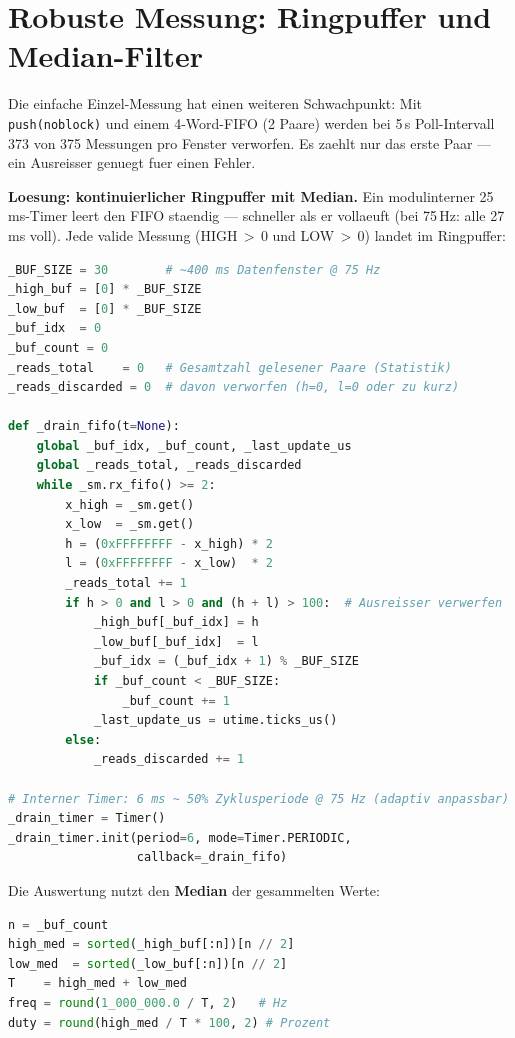 \documentclass[11pt,a4paper]{article}
\begin{document}
\section{Robuste Messung: Ringpuffer und Median-Filter}

Die einfache Einzel-Messung hat einen weiteren Schwachpunkt:
Mit \texttt{push(noblock)} und einem 4-Word-FIFO (2 Paare)
werden bei 5\,s Poll-Intervall 373 von 375 Messungen pro Fenster verworfen.
Es zaehlt nur das erste Paar --- ein Ausreisser genuegt fuer einen Fehler.

\textbf{Loesung: kontinuierlicher Ringpuffer mit Median.}
Ein modulinterner 25\,ms-Timer leert den FIFO staendig ---
schneller als er vollaeuft (bei 75\,Hz: alle 27\,ms voll).
Jede valide Messung (HIGH\,$>$\,0 und LOW\,$>$\,0) landet im Ringpuffer:

\begin{lstlisting}[language=Python, caption={25 ms Drain-Timer und Ringpuffer-Akkumulation}]
_BUF_SIZE = 30        # ~400 ms Datenfenster @ 75 Hz
_high_buf = [0] * _BUF_SIZE
_low_buf  = [0] * _BUF_SIZE
_buf_idx  = 0
_buf_count = 0
_reads_total    = 0   # Gesamtzahl gelesener Paare (Statistik)
_reads_discarded = 0  # davon verworfen (h=0, l=0 oder zu kurz)

def _drain_fifo(t=None):
    global _buf_idx, _buf_count, _last_update_us
    global _reads_total, _reads_discarded
    while _sm.rx_fifo() >= 2:
        x_high = _sm.get()
        x_low  = _sm.get()
        h = (0xFFFFFFFF - x_high) * 2
        l = (0xFFFFFFFF - x_low)  * 2
        _reads_total += 1
        if h > 0 and l > 0 and (h + l) > 100:  # Ausreisser verwerfen
            _high_buf[_buf_idx] = h
            _low_buf[_buf_idx]  = l
            _buf_idx = (_buf_idx + 1) % _BUF_SIZE
            if _buf_count < _BUF_SIZE:
                _buf_count += 1
            _last_update_us = utime.ticks_us()
        else:
            _reads_discarded += 1

# Interner Timer: 6 ms ~ 50% Zyklusperiode @ 75 Hz (adaptiv anpassbar)
_drain_timer = Timer()
_drain_timer.init(period=6, mode=Timer.PERIODIC,
                  callback=_drain_fifo)
\end{lstlisting}

Die Auswertung nutzt den \textbf{Median} der gesammelten Werte:

\begin{lstlisting}[language=Python, caption={Median-Berechnung aus Ringpuffer}]
n = _buf_count
high_med = sorted(_high_buf[:n])[n // 2]
low_med  = sorted(_low_buf[:n])[n // 2]
T    = high_med + low_med
freq = round(1_000_000.0 / T, 2)   # Hz
duty = round(high_med / T * 100, 2) # Prozent
\end{lstlisting}
\end{document}
